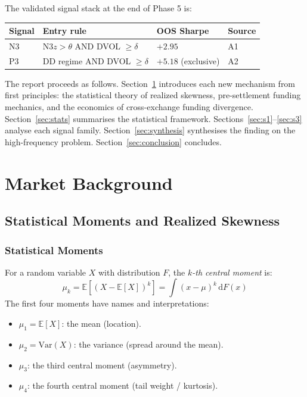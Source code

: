 \documentclass[12pt, a4paper]{article}
\theoremstyle{plain}
\theoremstyle{definition}
\newcommand{\E}{\mathbb{E}}
\newcommand{\Var}{\mathrm{Var}}
\begin{document}
The validated signal stack at the end of Phase 5 is:
\begin{center}
\begin{tabular}{llll}
\toprule
Signal & Entry rule & OOS Sharpe & Source \\
\midrule
N3 & N3$z > \theta$ AND DVOL $\geq \delta$ & $+2.95$ & A1 \\
P3 & DD regime AND DVOL $\geq \delta$ & $+5.18$ (exclusive) & A2 \\
\bottomrule
\end{tabular}
\end{center}

The report proceeds as follows. Section~\ref{sec:market} introduces
each new mechanism from first principles: the statistical theory of
realized skewness, pre-settlement funding mechanics, and the economics
of cross-exchange funding divergence.  Section~\ref{sec:stats} summarises
the statistical framework.  Sections~\ref{sec:s1}--\ref{sec:s3} analyse
each signal family.  Section~\ref{sec:synthesis} synthesises the finding
on the high-frequency problem.  Section~\ref{sec:conclusion} concludes.

\section{Market Background}
\label{sec:market}

\subsection{Statistical Moments and Realized Skewness}
\label{sec:skew_theory}

\subsubsection{Statistical Moments}

For a random variable $X$ with distribution $F$, the \emph{$k$-th
central moment} is:
\begin{equation}
  \mu_k = \E\!\left[(X - \E[X])^k\right]
  = \int (x - \mu)^k \,\mathrm{d}F(x)
\end{equation}
The first four moments have names and interpretations:
\begin{itemize}[noitemsep]
  \item $\mu_1 = \E[X]$: the mean (location).
  \item $\mu_2 = \Var(X)$: the variance (spread around the mean).
  \item $\mu_3$: the third central moment (asymmetry).
  \item $\mu_4$: the fourth central moment (tail weight / kurtosis).
\end{itemize}
\end{document}
